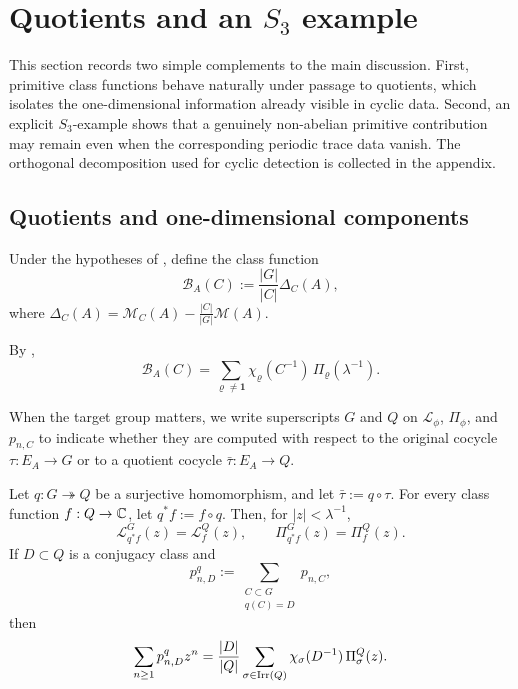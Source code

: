 \section[Quotients and an S3 example]{Quotients and an
  \texorpdfstring{$S_3$}{S3} example}
\label{sec:shadows}

This section records two simple complements to the main discussion.
First, primitive class functions behave naturally under passage to
quotients, which isolates the one-dimensional information already
visible in cyclic data. Second, an explicit \(S_3\)-example shows that
a genuinely non-abelian primitive contribution may remain even when the
corresponding periodic trace data vanish. The orthogonal decomposition
used for cyclic detection is collected in the appendix.

\subsection{Quotients and one-dimensional components}

\begin{definition}
  \label{def:normalised-primitive-class-profile}
  Under the hypotheses of , define the
  class function
  \[
    \mathcal B_A(C):=\frac{|G|}{|C|}\Delta_C(A),
  \]
  where \(\Delta_C(A)=\mathcal M_C(A)-\frac{|C|}{|G|}\mathcal M(A)\).
\end{definition}

By ,
\begin{equation}\label{eq:normalised-primitive-class-profile}
  \mathcal B_A(C)
  =
  \sum_{\varrho\neq \mathbf 1}
    \chi_\varrho(C^{-1})\,\Pi_\varrho(\lambda^{-1}).
\end{equation}

When the target group matters, we write superscripts \(G\) and \(Q\) on
\(\mathcal L_\phi\), \(\Pi_\phi\), and \(p_{n,C}\) to indicate whether
they are computed with respect to the original cocycle \(\tau:E_A\to G\)
or to a quotient cocycle \(\bar\tau:E_A\to Q\).

\begin{proposition}
  \label{thm:quotient-functoriality}
  Let \(q:G\twoheadrightarrow Q\) be a surjective homomorphism, and let
  \(\bar\tau:=q\circ\tau\). For every class function \(f:Q\to\mathbb{C}\), let
  \(q^\ast f:=f\circ q\). Then, for \(|z|<\lambda^{-1}\),
  \begin{equation}\label{eq:quotient-functoriality-log}
    \mathcal L_{q^\ast f}^{G}(z)=\mathcal L_f^{Q}(z),
    \qquad
    \Pi_{q^\ast f}^{G}(z)=\Pi_f^{Q}(z).
  \end{equation}
  If \(D\subset Q\) is a conjugacy class and
  \[
    p^q_{n,D}:=\sum_{\substack{C\subset G\\ q(C)=D}}p_{n,C},
  \]
  then
  \begin{equation}\label{eq:quotient-primitive-class-decomposition}
    \sum_{n\ge 1}p^q_{n,D}z^n
    =
    \frac{|D|}{|Q|}
      \sum_{\sigma\in\operatorname{Irr}(Q)}
        \chi_\sigma(D^{-1})\,\Pi_\sigma^{Q}(z).
  \end{equation}
\end{proposition}

